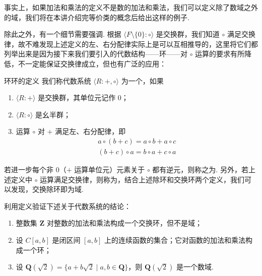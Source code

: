 事实上，如果加法和乘法的定义不是数的加法和乘法，我们可以定义除了数域之外的域，我们将在本讲介绍完等价类的概念后给出这样的例子.

除此之外，有一个细节需要强调. 根据 $\langle F\setminus\{0\}\colon\circ\rangle$ 是交换群，我们知道 $\circ$ 满足交换律，故不难发现上述定义的左、右分配律实际上是可以互相推导的，这里将它们都列举出来是因为接下来我们要引入的代数结构——环——对 $\circ$ 运算的要求有所降低，不一定能保证交换律成立，但也有广泛的应用：

\begin{definition}{环}{环的定义} 
    我们称代数系统 $\langle R\colon+,\circ\rangle$ 为一个，如果
    \begin{enumerate}
        \item $\langle R\colon+\rangle$ 是交换群，其单位元记作 $0$；

        \item $\langle R\colon\circ\rangle$ 是幺半群；

        \item 运算 $\circ$ 对 $+$ 满足左、右分配律，即
              \begin{gather*}
                  a \circ (b + c) = a \circ b + a \circ c \\
                  (b + c) \circ a = b \circ a + c \circ a
              \end{gather*}
    \end{enumerate}

    若进一步每个非 $0$（$+$ 运算单位元）元素关于 $\circ$ 都有逆元，则称之为. 另外，若上述定义中 $\circ$ 运算满足交换律，则称为，结合上述除环和交换环两个定义，我们可以发现，交换除环即为域.
\end{definition}

\begin{example}{}{}
    利用定义验证下述关于代数系统的结论：
    \begin{enumerate}
        \item 整数集 $\mathbf{Z}$ 对整数的加法和乘法构成一个交换环，但不是域；

        \item 设 $C[a,b]$ 是闭区间 $[a,b]$ 上的连续函数的集合；它对函数的加法和乘法构成一个环；

        \item 设 $\mathbf{Q}(\sqrt{2})=\{a + b\sqrt{2} \mid a, b \in \mathbf{Q}\}$，则 $\mathbf{Q}(\sqrt{2})$ 是一个数域.
    \end{enumerate}
\end{example}

